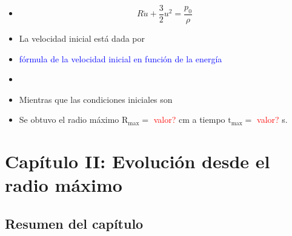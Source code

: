 \documentclass[aps,prb,twocolumn,superscriptaddress,floatfix,longbibliography,10pt]{revtex4-2}
\begin{document}
\begin{itemize}
  \item 
  \begin{equation}
    R \dot{u} + \frac{3}{2}u^2 = \frac{p_0}{\rho}
    \label{eq:bubston_ec_dif_R}
  \end{equation}


  \item La velocidad inicial está dada por 
  \item \textcolor{blue}{fórmula de la velocidad inicial en función de la energía}
  \item 
  \item Mientras que las condiciones iniciales son 
  \item Se obtuvo el radio máximo $\mathrm{R_{max}} = $ \textcolor{red}{valor?} cm a tiempo $\mathrm{t_{max}} = $ \textcolor{red}{valor?} s.
\end{itemize}






























\section*{Capítulo II: Evolución desde el radio máximo}

\subsection{Resumen del capítulo}
\end{document}
